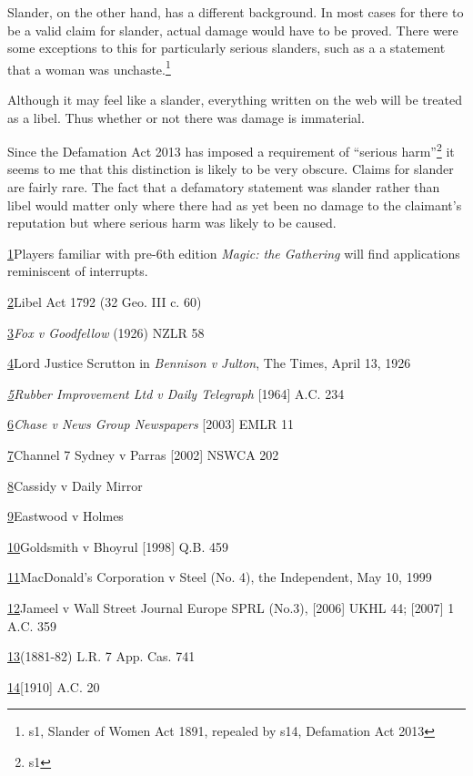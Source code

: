\documentclass[]{article}
\begin{document}
Slander, on the other hand, has a different background. In most cases
for there to be a valid claim for slander, actual damage would have to
be proved. There were some exceptions to this for particularly serious
slanders, such as a a statement that a woman was unchaste.\footnote{s1, Slander of Women Act 1891, repealed by s14, Defamation Act 2013}

Although it may feel like a slander, everything written on the web will
be treated as a libel. Thus whether or not there was damage is
immaterial.

Since the Defamation Act 2013 has imposed a requirement of ``serious harm''\footnote{s1} it seems to me that this distinction is likely to be very obscure. Claims for slander are fairly rare. The fact that a defamatory statement was slander rather than libel would matter only where there had as yet been no damage to the claimant's reputation but where serious harm was likely to be caused.


\hyperref[sdfootnote1anc]{1}Players familiar with pre-6th edition
\emph{Magic: the Gathering} will find applications reminiscent of
interrupts.

\hyperref[sdfootnote2anc]{2}Libel Act 1792 (32 Geo. III c. 60)

\hyperref[sdfootnote3anc]{3}\emph{Fox v Goodfellow} (1926) NZLR 58

\hyperref[sdfootnote4anc]{4}Lord Justice Scrutton in \emph{Bennison v
Julton}{, The Times, April 13, 1926}

\emph{\hyperref[sdfootnote5anc]{5}Rubber Improvement Ltd v Daily
Telegraph}{ {[}1964{]} A.C. 234}

\hyperref[sdfootnote6anc]{6}\emph{Chase v News Group Newspapers}
{[}2003{]} EMLR 11

\hyperref[sdfootnote7anc]{7}Channel 7 Sydney v Parras {[}2002{]} NSWCA
202

\hyperref[sdfootnote8anc]{8}Cassidy v Daily Mirror

\hyperref[sdfootnote9anc]{9}Eastwood v Holmes

\hyperref[sdfootnote10anc]{10}Goldsmith v Bhoyrul {[}1998{]} Q.B. 459

\hyperref[sdfootnote11anc]{11}MacDonald's Corporation v Steel (No. 4),
the Independent, May 10, 1999

\hyperref[sdfootnote12anc]{12}Jameel v Wall Street Journal Europe SPRL
(No.3), {[}2006{]} UKHL 44; {[}2007{]} 1 A.C. 359

\hyperref[sdfootnote13anc]{13}(1881-82) L.R. 7 App. Cas. 741

\hyperref[sdfootnote14anc]{14}{[}1910{]} A.C. 20
\end{document}
